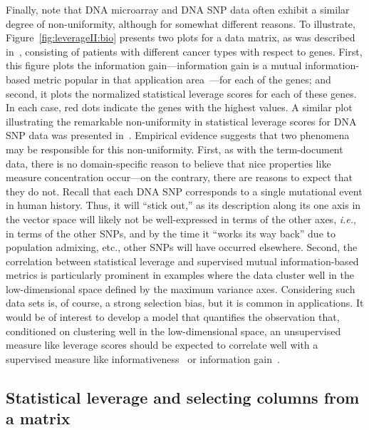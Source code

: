 \documentclass[twoside]{article}
\begin{document}
Finally, note that DNA microarray and DNA SNP data often exhibit a similar 
degree of non-uniformity, although for somewhat different reasons.
To illustrate, Figure~\ref{fig:leverageII:bio} presents two plots for a data 
matrix, as was described in~\cite{CUR_PNAS}, consisting of  patients 
with  different cancer types with respect to  genes. 
First, this figure plots the information gain---information gain is a mutual 
information-based metric popular in that application 
area~\cite{Paschou07b,CUR_PNAS}---for each of the  genes; and
second, it plots the normalized statistical leverage scores for each of 
these genes.
In each case, red dots indicate the genes with the highest values.
A similar plot illustrating the remarkable non-uniformity in statistical 
leverage scores for DNA SNP data was presented in~\cite{Paschou07b}.
Empirical evidence suggests that two phenomena may be responsible for this 
non-uniformity.
First, as with the term-document data, there is no domain-specific reason to 
believe that nice properties like measure concentration occur---on the 
contrary, there are reasons to expect that they do not.
Recall that each DNA SNP corresponds to a single mutational event in human 
history.
Thus, it will ``stick out,'' as its description along its one axis in the 
vector space will likely not be well-expressed in terms of the other axes, 
\emph{i.e.}, in terms of the other SNPs, and by the time it ``works its way 
back'' due to population admixing, etc., other SNPs will have occurred 
elsewhere.
Second, the correlation between statistical leverage and supervised mutual 
information-based metrics is particularly prominent in examples where the 
data cluster well in the low-dimensional space defined by the maximum 
variance axes.
Considering such data sets is, of course, a strong selection bias, but it is 
common in applications.
It would be of interest to develop a model that quantifies the observation
that, conditioned on clustering well in the low-dimensional space, an 
unsupervised measure like leverage scores should be expected to correlate 
well with a supervised measure like informativeness~\cite{Paschou07b} or
information gain~\cite{CUR_PNAS}.


\subsection{Statistical leverage and selecting columns from a matrix} 
\label{sxn:empirical-cssp}
\end{document}
